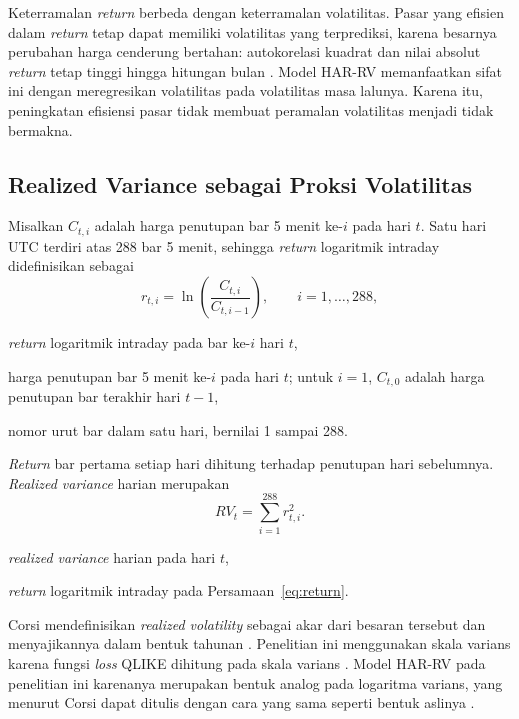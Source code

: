 Keterramalan \textit{return} berbeda dengan keterramalan volatilitas. Pasar
yang efisien dalam \textit{return} tetap dapat memiliki volatilitas yang
terprediksi, karena besarnya perubahan harga cenderung bertahan:
autokorelasi kuadrat dan nilai absolut \textit{return} tetap tinggi hingga
hitungan bulan \cite{corsi2009}. Model HAR-RV memanfaatkan sifat ini dengan
meregresikan volatilitas pada volatilitas masa lalunya. Karena itu,
peningkatan efisiensi pasar tidak membuat peramalan volatilitas menjadi tidak
bermakna.

\subsection{Realized Variance sebagai Proksi Volatilitas}
\label{subsec:rv}
Misalkan $C_{t,i}$ adalah harga penutupan bar 5 menit ke-$i$ pada hari $t$.
Satu hari UTC terdiri atas 288 bar 5 menit, sehingga \textit{return}
logaritmik intraday didefinisikan sebagai
\begin{equation}
  r_{t,i} = \ln\!\left(\frac{C_{t,i}}{C_{t,i-1}}\right),
  \qquad i = 1, \dots, 288,
  \label{eq:return}
\end{equation}
\begin{keterangan}
  \item[$r_{t,i}$] \textit{return} logaritmik intraday pada bar ke-$i$ hari $t$,
  \item[$C_{t,i}$] harga penutupan bar 5 menit ke-$i$ pada hari $t$; untuk
    $i = 1$, $C_{t,0}$ adalah harga penutupan bar terakhir hari $t-1$,
  \item[$i$] nomor urut bar dalam satu hari, bernilai 1 sampai 288.
\end{keterangan}
\textit{Return} bar pertama setiap hari dihitung terhadap penutupan hari
sebelumnya. \textit{Realized variance} harian merupakan
\begin{equation}
  RV_t = \sum_{i=1}^{288} r_{t,i}^2 .
  \label{eq:rv}
\end{equation}
\begin{keterangan}
  \item[$RV_t$] \textit{realized variance} harian pada hari $t$,
  \item[$r_{t,i}$] \textit{return} logaritmik intraday pada
    Persamaan~\ref{eq:return}.
\end{keterangan}
Corsi mendefinisikan \textit{realized volatility} sebagai akar dari besaran
tersebut dan menyajikannya dalam bentuk tahunan \cite{corsi2009}. Penelitian
ini menggunakan skala varians karena fungsi \textit{loss} QLIKE dihitung pada
skala varians \cite{patton2011}. Model HAR-RV pada penelitian ini karenanya
merupakan bentuk analog pada logaritma varians, yang menurut Corsi dapat
ditulis dengan cara yang sama seperti bentuk aslinya \cite{corsi2009}.

